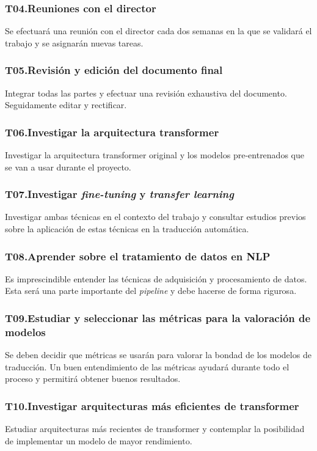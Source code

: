 \subsubsection{T04.\quad Reuniones con el director}\label{T04}
Se efectuará una reunión con el director cada dos semanas en la que se validará el trabajo
y se asignarán nuevas tareas.
\subsubsection{T05.\quad Revisión y edición del documento final}\label{T05}
Integrar todas las partes y efectuar una revisión exhaustiva del documento. Seguidamente
editar y rectificar.
\subsubsection{T06.\quad Investigar la arquitectura transformer}\label{T06}
Investigar la arquitectura transformer original y los modelos pre-entrenados que se van
a usar durante el proyecto.
\subsubsection{T07.\quad Investigar \textit{fine-tuning} y \textit{transfer learning}}\label{T07}
Investigar ambas técnicas en el contexto del trabajo y consultar estudios previos sobre
la aplicación de estas técnicas en la traducción automática.
\subsubsection{T08.\quad Aprender sobre el tratamiento de datos en NLP}\label{T08}
Es imprescindible entender las técnicas de adquisición y procesamiento de datos. Esta será
una parte importante del \textit{pipeline} y debe hacerse de forma rigurosa.
\subsubsection{T09.\quad Estudiar y seleccionar las métricas para la valoración de modelos}\label{T09}
Se deben decidir que métricas se usarán para valorar la bondad de los modelos de traducción.
Un buen entendimiento de las métricas ayudará durante todo el proceso y permitirá obtener
buenos resultados.
\subsubsection{T10.\quad Investigar arquitecturas más eficientes de transformer}\label{T10}
Estudiar arquitecturas más recientes de transformer y contemplar la posibilidad de
implementar un modelo de mayor rendimiento.
